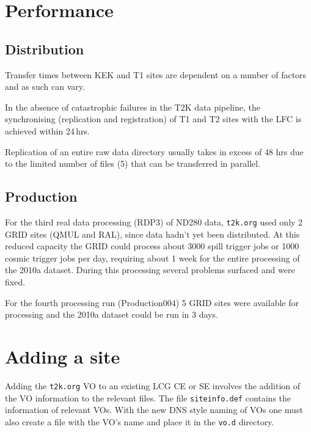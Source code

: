 \documentclass[11pt]{article}
\begin{document}
\clearpage
\section{Performance}
\label{sec:perf}

\subsection{Distribution}

Transfer times between KEK and T1 sites are dependent on a number of
factors and as such can vary.

In the absence of catastrophic failures in the T2K data pipeline, the
synchronising (replication and registration) of T1 and T2 sites with
the LFC is achieved within 24\,hrs.

Replication of an entire raw data directory usually takes in excess
of 48 hrs due to the limited number of files (5) that can be
transferred in parallel.

\subsection{Production}

For the third real data processing (RDP3) of ND280 data,
\verb+t2k.org+ used only 2 GRID sites (QMUL and RAL), since data
hadn't yet been distributed. At this reduced capacity the GRID could
process about 3000 spill trigger jobs or 1000 cosmic trigger jobs per
day, requiring about 1 week for the entire processing of the 2010a
dataset. During this processing several problems surfaced and were
fixed.

For the fourth processing run (Production004) 5 GRID sites were
available for processing and the 2010a dataset could be run in 3 days.


\clearpage
\section{Adding a site}
\label{sec:sites}
Adding the \verb+t2k.org+ VO to an existing LCG CE or SE involves the
addition of the VO information to the relevant files. The file
\verb+siteinfo.def+ contains the information of relevant VOs. With
the new DNS style naming of VOs one must also create a file with the
VO's name and place it in the \verb+vo.d+ directory.
\end{document}
